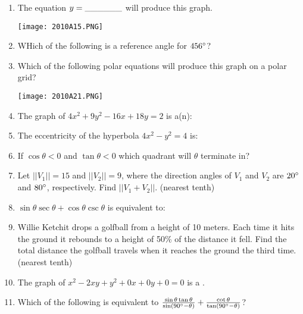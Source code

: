 \documentclass[../uilmath.tex]{subfiles}
\begin{document}
\begin{enumerate}[label=\bfseries\arabic*.]
    \item %
    The equation $y=\_\_\_\_\_\_$ will produce this graph.
    \begin{center}
        \texttt{[image: 2010A15.PNG]}
    \end{center}

    \item %
    WHich of the following is a reference angle for $456\degree$?

    \item %
    Which of the following polar equations will produce this graph on a polar grid?
    \begin{center}
        \texttt{[image: 2010A21.PNG]}
    \end{center}

    \item %
    The graph of $4x^2+9y^2-16x+18y=2$ is a(n):

    \item %
    The eccentricity of the hyperbola $4x^2-y^2=4$ is:

    \item %
    If $\cos\theta < 0$ and $\tan\theta<0$ which quadrant will $\theta$ terminate in?

    \item %
    Let $||V_1||=15$ and $||V_2||=9$, where the direction angles of $V_1$ and $V_2$ are $20\degree$ and $80\degree$, respectively. Find $||V_1+V_2||$. (nearest tenth)

    \item %
    $\sin\theta \sec\theta + \cos\theta\csc\theta$ is equivalent to:

    \item %
    Willie Ketchit drops a golfball from a height of 10 meters. Each time it hits the ground it rebounds to a height of 50\% of the distance it fell.
    Find the total distance the golfball travels when it reaches the ground the third time. (nearest tenth)

    \item %
    The graph of $x^2-2xy+y^2+0x+0y+0=0$ is a \blank .

    \item %
    Which of the following is equivalent to $\frac{\sin\theta \tan\theta}{\sin(90\degree - \theta)}+\frac{\cot\theta}{\tan(90\degree-\theta)}$?


\end{enumerate}
\end{document}
